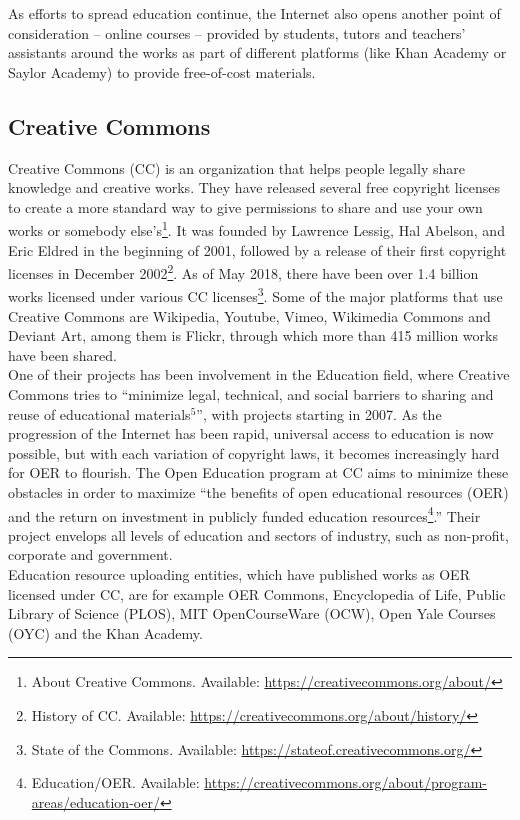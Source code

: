 \documentclass[a4paper]{article}
\begin{document}
\noindent
As efforts to spread education continue, the Internet also opens another point of consideration -- online courses -- provided by students, tutors and teachers' assistants around the works as part of different platforms (like Khan Academy or Saylor Academy) to provide free-of-cost materials. 

\subsection{Creative Commons} \label{cc}

Creative Commons (CC) is an organization that helps people legally share knowledge and creative works. They have released several free copyright licenses to create a more standard way to give permissions to share and use your own works or somebody else's\footnote{About Creative Commons. Available: \url{https://creativecommons.org/about/}}. It was founded by Lawrence Lessig, Hal Abelson, and Eric Eldred in the beginning of 2001, followed by a release of their first copyright licenses in December 2002\footnote{History of CC. Available: \url{https://creativecommons.org/about/history/}}. As of May 2018, there have been over 1.4 billion works licensed under various CC licenses\footnote{State of the Commons. Available: \url{https://stateof.creativecommons.org/}}. 
Some of the major platforms that use Creative Commons are Wikipedia, Youtube, Vimeo, Wikimedia Commons and Deviant Art, among them is Flickr, through which more than 415 million works have been shared. \\

\noindent
One of their projects has been involvement in the Education field, where Creative Commons tries to ``minimize legal, technical, and social barriers to sharing and reuse of educational materials$^5$'', with projects starting in 2007. As the progression of the Internet has been rapid, universal access to education is now possible, but with each variation of copyright laws, it becomes increasingly hard for OER to flourish. The Open Education program at CC aims to minimize these obstacles in order to maximize ``the benefits of open educational resources (OER) and the return on investment in publicly funded education resources\footnote{Education/OER. Available:  \url{https://creativecommons.org/about/program-areas/education-oer/}}.'' Their project envelops all levels of education and sectors of industry, such as non-profit, corporate and government. \\

\noindent
Education resource uploading entities, which have published works as OER licensed under CC, are for example OER Commons, Encyclopedia of Life, Public Library of Science (PLOS), MIT OpenCourseWare (OCW), Open Yale Courses (OYC) and the Khan Academy.
\end{document}
